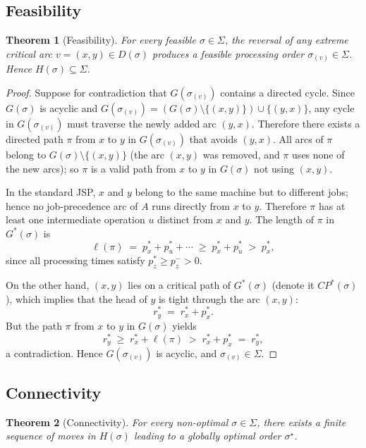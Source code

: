 \documentclass[preprint,12pt]{elsarticle}
\newtheorem{theorem}{Theorem}
\begin{document}
\subsection{Feasibility}
\label{sec4.3}

\begin{theorem}[Feasibility]
\label{thm1}
For every feasible $\sigma \in \Sigma$, the reversal of any extreme critical arc $v = (x,y) \in D(\sigma)$ produces a feasible processing order $\sigma_{(v)} \in \Sigma$. Hence $H(\sigma) \subseteq \Sigma$.
\end{theorem}

\begin{proof}
Suppose for contradiction that $G(\sigma_{(v)})$ contains a directed cycle.
Since $G(\sigma)$ is acyclic and $G(\sigma_{(v)})=(G(\sigma)\setminus\{(x,y)\})\cup\{(y,x)\}$,
any cycle in $G(\sigma_{(v)})$ must traverse the newly added arc $(y,x)$.
Therefore there exists a directed path $\pi$ from $x$ to $y$ in $G(\sigma_{(v)})$ that avoids $(y,x)$.
All arcs of $\pi$ belong to $G(\sigma)\setminus\{(x,y)\}$ (the arc $(x,y)$ was removed, and $\pi$ uses none of the new arcs); so $\pi$ is a valid path from $x$ to $y$ in $G(\sigma)$ not using $(x,y)$.

In the standard JSP, $x$ and $y$ belong to the same machine but to different jobs; hence no job-precedence arc of $A$ runs directly from $x$ to $y$.
Therefore $\pi$ has at least one intermediate operation $u$ distinct from $x$ and $y$.
The length of $\pi$ in $G^*(\sigma)$ is
\[
  \ell(\pi) \;=\; p_x^* + p_u^* + \cdots \;\ge\; p_x^* + p_u^* \;>\; p_x^*,
\]
since all processing times satisfy $p_z^*\ge p_z^->0$.

On the other hand, $(x,y)$ lies on a critical path of $G^*(\sigma)$ (denote it $CP^*(\sigma)$), which implies that the head of $y$ is tight through the arc $(x,y)$:
\[
  r_y^* \;=\; r_x^* + p_x^*.
\]
But the path $\pi$ from $x$ to $y$ in $G(\sigma)$ yields
\[
  r_y^* \;\ge\; r_x^* + \ell(\pi) \;>\; r_x^*+p_x^* \;=\; r_y^*,
\]
a contradiction.
Hence $G(\sigma_{(v)})$ is acyclic, and $\sigma_{(v)}\in\Sigma$.
\end{proof}

\subsection{Connectivity}
\label{sec4.4}

\begin{theorem}[Connectivity]
\label{thm2}
For every non-optimal $\sigma \in \Sigma$, there exists a finite sequence of moves in $H(\sigma)$ leading to a globally optimal order $\sigma^{\star}$.
\end{theorem}
\end{document}
